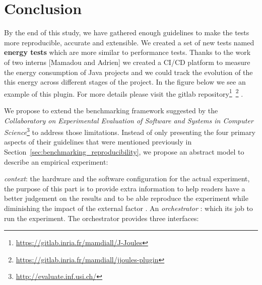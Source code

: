 
\section{Conclusion }


By the end of this study, we have gathered enough guidelines to make the tests more reproducible, accurate and extensible.
We created a set of new tests named \textbf{energy tests} which are more similar to performance tests.
Thanks to the work of two interns [Mamadou and Adrien] we created a CI/CD platform to measure the energy consumption of Java projects and we could track the evolution of the this energy across different stages of the project.
In the figure below we see an example of this plugin.
For more details please visit the gitlab repository\footnote{\url{https://gitlab.inria.fr/mamdiall/J-Joules}}~\footnote{\url{https://gitlab.inria.fr/mamdiall/jjoules-plugin}} .

We propose to extend the benchmarking framework suggested by the \emph{Collaboratory on Experimental Evaluation of Software and Systems in Computer Science}\footnote{\url{http://evaluate.inf.usi.ch/}} to address those limitations.
Instead of only presenting the four primary aspects of their guidelines that were mentioned previously in Section~\ref{sec:benchmarking_reproducibility}, we propose an abstract model to describe an empirical experiment:

\emph{context}: the hardware and the software configuration for the actual experiment, the purpose of this part is to provide extra information to help readers have a better judgement on the results and to be able reproduce the experiment while diminishing the impact of the external factor .
An \emph{orchestrator} : which its job to run the experiment.
The orchestrator provides three interfaces:

